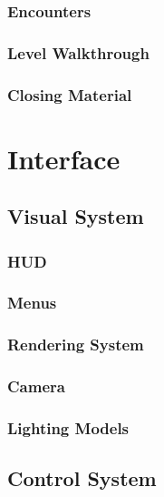 \documentclass[12pt,titlepage]{article}
\begin{document}
\subsubsection{Encounters}

\subsubsection{Level Walkthrough}

\subsubsection{Closing Material}


\newpage
\section{Interface}

\subsection{Visual System}

\subsubsection{HUD}

\subsubsection{Menus}

\subsubsection{Rendering System}

\subsubsection{Camera}

\subsubsection{Lighting Models}

\subsection{Control System}
\end{document}
